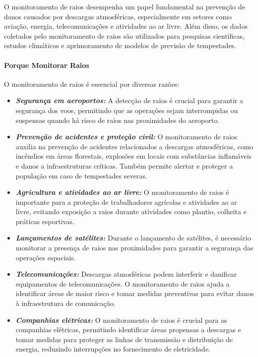 \documentclass[a4paper, 12pt, onecolumn,singlespacing]{article}
\begin{document}
	O monitoramento de raios desempenha um papel fundamental na prevenção de danos causados por descargas atmosféricas, especialmente em setores como aviação, energia, telecomunicações e atividades ao ar livre. Além disso, os dados coletados pelo monitoramento de raios são utilizados para pesquisas científicas, estudos climáticos e aprimoramento de modelos de previsão de tempestades.
	
	\paragraph{Porque Monitorar Raios}
	
	O monitoramento de raios é essencial por diversas razões:
	
	\begin{itemize}
	
		\item \textbf{\textit{Segurança em aeroportos:}} A detecção de raios é crucial para garantir a segurança dos voos, permitindo que as operações sejam interrompidas ou suspensas quando há risco de raios nas proximidades do aeroporto.
		
		\item \textbf{\textit{Prevenção de acidentes e proteção civil:}} O monitoramento de raios auxilia na prevenção de acidentes relacionados a descargas atmosféricas, como incêndios em áreas florestais, explosões em locais com substâncias inflamáveis e danos a infraestruturas críticas. Também permite alertar e proteger a população em caso de tempestades severas.
		
		\item \textbf{\textit{Agricultura e atividades ao ar livre:}} O monitoramento de raios é importante para a proteção de trabalhadores agrícolas e atividades ao ar livre, evitando exposição a raios durante atividades como plantio, colheita e práticas esportivas.
		
		\item \textbf{\textit{Lançamentos de satélites:}} Durante o lançamento de satélites, é necessário monitorar a presença de raios nas proximidades para garantir a segurança das operações espaciais.
		
		\item \textbf{\textit{Telecomunicações:}} Descargas atmosféricas podem interferir e danificar equipamentos de telecomunicações. O monitoramento de raios ajuda a identificar áreas de maior risco e tomar medidas preventivas para evitar danos à infraestrutura de comunicação.
		
		\item \textbf{\textit{Companhias elétricas:}} O monitoramento de raios é crucial para as companhias elétricas, permitindo identificar áreas propensas a descargas e tomar medidas para proteger as linhas de transmissão e distribuição de energia, reduzindo interrupções no fornecimento de eletricidade.
		
	\end{itemize}
	
\end{document}
